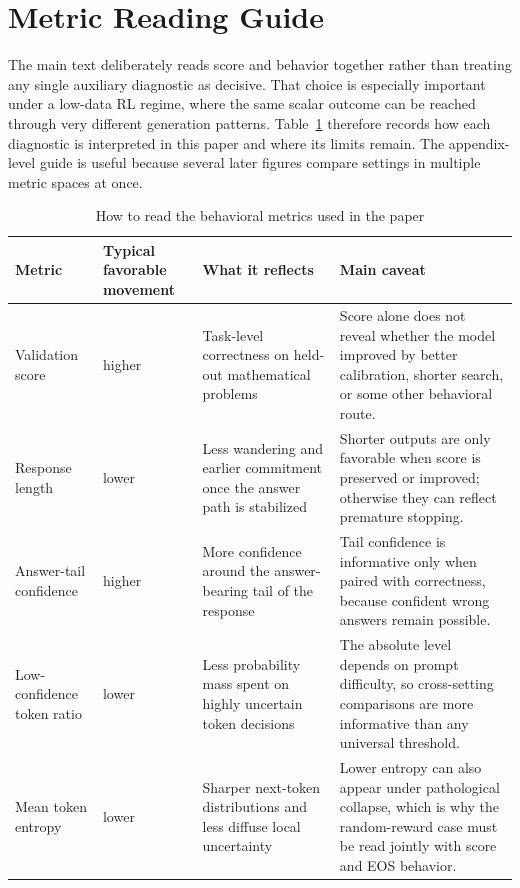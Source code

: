 \documentclass[12pt,a4paper]{ctexart}
\begin{document}
\section{Metric Reading Guide}

The main text deliberately reads score and behavior together rather than treating any single auxiliary diagnostic as decisive. That choice is especially important under a low-data RL regime, where the same scalar outcome can be reached through very different generation patterns. Table~\ref{tab:en-metric-reading-guide} therefore records how each diagnostic is interpreted in this paper and where its limits remain. The appendix-level guide is useful because several later figures compare settings in multiple metric spaces at once.

\begin{table}[H]
    \centering
    \caption{How to read the behavioral metrics used in the paper}
    \label{tab:en-metric-reading-guide}
    \scriptsize
    \setlength{\tabcolsep}{4pt}
    \renewcommand{\arraystretch}{1.18}
    \begin{tabular}{>{\raggedright\arraybackslash}p{2.5cm}>{\raggedright\arraybackslash}p{2.2cm}>{\raggedright\arraybackslash}p{4.2cm}>{\raggedright\arraybackslash}p{4.4cm}}
        \toprule
        Metric & Typical favorable movement & What it reflects & Main caveat \\
        \midrule
        Validation score & higher & Task-level correctness on held-out mathematical problems & Score alone does not reveal whether the model improved by better calibration, shorter search, or some other behavioral route. \\
        Response length & lower & Less wandering and earlier commitment once the answer path is stabilized & Shorter outputs are only favorable when score is preserved or improved; otherwise they can reflect premature stopping. \\
        Answer-tail confidence & higher & More confidence around the answer-bearing tail of the response & Tail confidence is informative only when paired with correctness, because confident wrong answers remain possible. \\
        Low-confidence token ratio & lower & Less probability mass spent on highly uncertain token decisions & The absolute level depends on prompt difficulty, so cross-setting comparisons are more informative than any universal threshold. \\
        Mean token entropy & lower & Sharper next-token distributions and less diffuse local uncertainty & Lower entropy can also appear under pathological collapse, which is why the random-reward case must be read jointly with score and EOS behavior. \\

\end{tabular}
\end{table}
\end{document}
